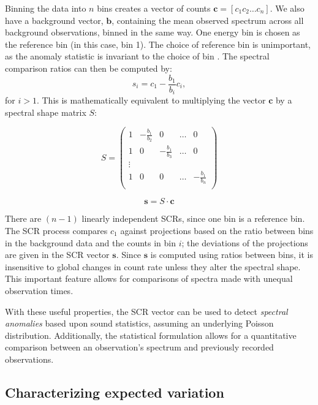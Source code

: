 Binning the data into \(n\)
bins creates a vector of counts \(\mathbf{c} = [ c_1 c_2 \ldots c_n]\). We also
have a background vector, \(\mathbf{b}\), containing the mean observed spectrum
across all background observations, binned in the same way.  One energy bin is
chosen as the reference bin (in this case, bin 1). The choice of reference bin
is unimportant, as the anomaly statistic is invariant to the choice of bin
\cite{Runkle:2009ev}. The spectral comparison ratios can then be computed by:
\begin{equation}\label{scr}
s_i = c_1 - \frac{b_1}{b_i} c_i,
\end{equation}
for \(i > 1\). This is mathematically equivalent to multiplying the vector
\(\mathbf{c}\) by a spectral shape matrix \(S\):

\begin{equation}
S = \begin{pmatrix}
1 & - \frac{b_1}{b_2} & 0 & \ldots & 0 \\
1 & 0 & - \frac{b_1}{b_3} & \ldots & 0\\
\vdots \\
1 & 0 & 0 & \ldots & -\frac{b_1}{b_n} \\
\end{pmatrix}
\end{equation}

\begin{equation}
\mathbf{s} = S \cdot \mathbf{c}
\end{equation}

There are \((n - 1)\) linearly independent SCRs, since one bin is a reference
bin.  The SCR process compares \(c_1\) against projections based on the ratio
between bins in the background data and the counts in bin \(i\); the deviations
of the projections are given in the SCR vector \(\mathbf{s}\).  Since
\(\mathbf{s}\) is computed using ratios between bins, it is insensitive to
global changes in count rate unless they alter the spectral shape.  This
important feature allows for comparisons of spectra made with unequal
observation times.

With these useful properties, the SCR vector can be used to detect
\textit{spectral anomalies} based upon sound statistics, assuming an underlying
Poisson distribution.  Additionally, the statistical formulation allows for a
quantitative comparison between an observation's spectrum and previously
recorded observations.

\subsection{Characterizing expected variation}

